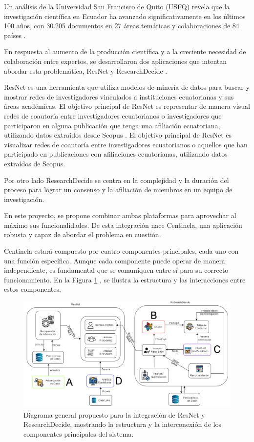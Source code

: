 Un análisis de la Universidad San Francisco de Quito (USFQ) revela que la investigación científica en Ecuador ha avanzado significativamente en los últimos 100 años, con 30.205 documentos en 27 áreas temáticas y colaboraciones de 84 países \cite{primicias2020}.


En respuesta al aumento de la producción científica y a la creciente necesidad de colaboración entre expertos, se desarrollaron dos aplicaciones que intentan abordar esta problemática, ResNet \cite{RESNET} y ResearchDecide \cite{Aimacana_2023} \cite{Padilla_2023}.

ResNet es una herramienta que utiliza modelos de minería de datos para buscar y mostrar redes de investigadores vinculados a instituciones ecuatorianas y sus áreas académicas. El objetivo principal de ResNet es representar de manera visual redes de coautoría entre investigadores ecuatorianos o investigadores que participaron en alguna publicación que tenga una afiliación ecuatoriana, utilizando datos extraídos desde Scopus \cite{SCOPUS}. El objetivo principal de ResNet es visualizar redes de coautoría entre investigadores ecuatorianos o aquellos que han participado en publicaciones con afiliaciones ecuatorianas, utilizando datos extraídos de Scopus.

Por otro lado ResearchDecide  se centra en la complejidad y la duración del proceso para lograr un consenso y la afiliación de miembros en un equipo de investigación.

En este proyecto, se propone combinar ambas plataformas para aprovechar al máximo sus funcionalidades. De esta integración nace Centinela, una aplicación robusta y capaz de abordar el problema en cuestión.

Centinela estará compuesto por cuatro componentes principales, cada uno con una función específica. Aunque cada componente puede operar de manera independiente, es fundamental que se comuniquen entre sí para su correcto funcionamiento. En la Figura \ref{fig:centinela-diagram} , se ilustra la estructura y las interacciones entre estos componentes.

\begin{figure}[H]
    \centering
    \includegraphics[scale=0.5]{../02Figures/01Chapter/centinela-architecture.png}
    \caption{Diagrama general propuesto para la integración de ResNet y ResearchDecide, mostrando la estructura y la interconexión de los componentes principales del sistema.}
    \label{fig:centinela-diagram}
\end{figure}

